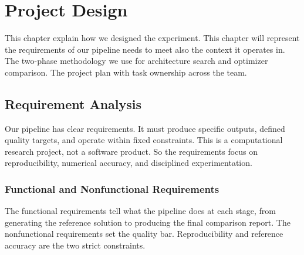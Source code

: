 \chapter{Project Design}

This chapter explain how we designed the experiment. This chapter will represent the requirements of our pipeline needs to meet also the context it operates in. The two-phase methodology we use for architecture search and optimizer comparison. The project plan with task ownership across the team.

\section{Requirement Analysis}

Our pipeline has clear requirements. It must produce specific outputs, defined quality targets, and operate within fixed constraints. This is a computational research project, not a software product. So the requirements focus on reproducibility, numerical accuracy, and disciplined experimentation.

\subsection{Functional and Nonfunctional Requirements}

The functional requirements tell what the pipeline does at each stage, from generating the reference solution to producing the final comparison report. The nonfunctional requirements set the quality bar. Reproducibility and reference accuracy are the two strict constraints.


